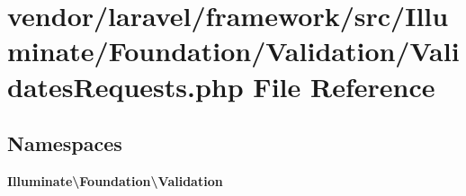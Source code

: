 \section{vendor/laravel/framework/src/\+Illuminate/\+Foundation/\+Validation/\+Validates\+Requests.php File Reference}
\label{_validates_requests_8php}
\subsection*{Namespaces}
\begin{DoxyCompactItemize}
\item 
 {\bf Illuminate\textbackslash{}\+Foundation\textbackslash{}\+Validation}
\end{DoxyCompactItemize}
